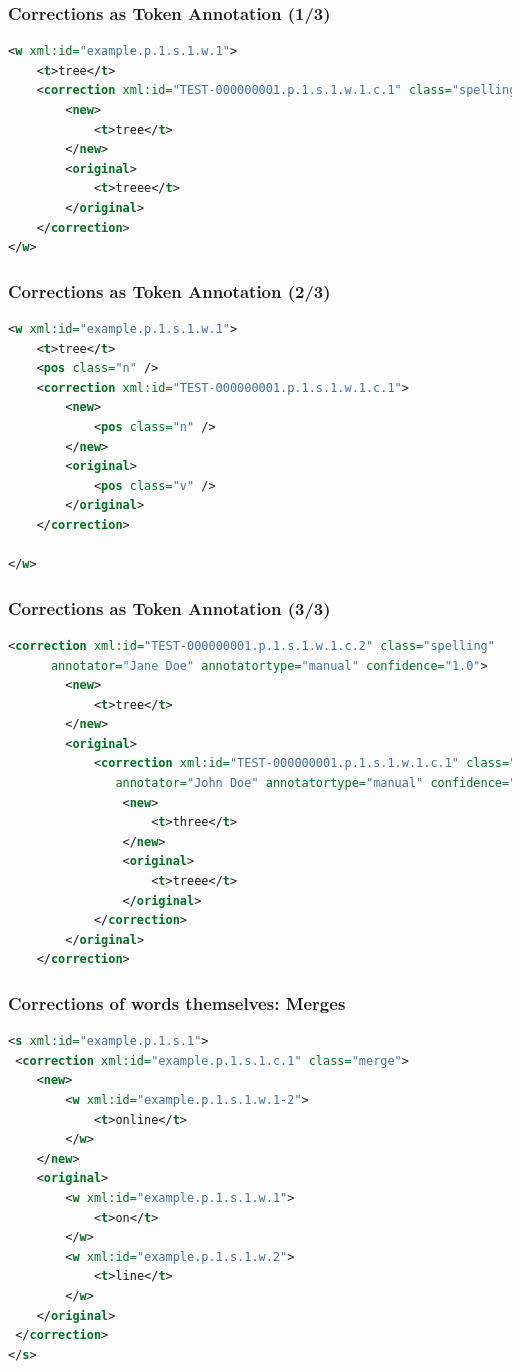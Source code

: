 \documentclass[compress]{beamer}
\begin{document}
        
\begin{frame}[fragile]
\frametitle{Corrections as Token Annotation (1/3)}

\begin{lstlisting}[language=xml]
<w xml:id="example.p.1.s.1.w.1">
    <t>tree</t>
    <correction xml:id="TEST-000000001.p.1.s.1.w.1.c.1" class="spelling">
        <new>
            <t>tree</t>
        </new>
        <original>
            <t>treee</t>
        </original>
    </correction>
</w>
\end{lstlisting}                 

\end{frame}


\begin{frame}[fragile]
\frametitle{Corrections as Token Annotation (2/3)}

\begin{lstlisting}[language=xml]
<w xml:id="example.p.1.s.1.w.1">
    <t>tree</t>
    <pos class="n" />
    <correction xml:id="TEST-000000001.p.1.s.1.w.1.c.1">
        <new>
            <pos class="n" />
        </new>
        <original>
            <pos class="v" />
        </original>
    </correction>
    
</w>    
\end{lstlisting}

\end{frame}

\begin{frame}[fragile]
\frametitle{Corrections as Token Annotation (3/3)}

\begin{lstlisting}[language=xml]
    <correction xml:id="TEST-000000001.p.1.s.1.w.1.c.2" class="spelling" 
      annotator="Jane Doe" annotatortype="manual" confidence="1.0">
        <new>
            <t>tree</t>
        </new>
        <original>
            <correction xml:id="TEST-000000001.p.1.s.1.w.1.c.1" class="spelling"
               annotator="John Doe" annotatortype="manual" confidence="0.6">
                <new>
                    <t>three</t>
                </new>
                <original>
                    <t>treee</t>
                </original>
            </correction>
        </original>
    </correction>
\end{lstlisting}

\end{frame}

\begin{frame}[fragile]
\frametitle{Corrections of words themselves: Merges}

\begin{lstlisting}[language=xml]
<s xml:id="example.p.1.s.1">
 <correction xml:id="example.p.1.s.1.c.1" class="merge">
    <new>
        <w xml:id="example.p.1.s.1.w.1-2">    
            <t>online</t>
        </w>
    </new>
    <original>
        <w xml:id="example.p.1.s.1.w.1">
            <t>on</t>
        </w>
        <w xml:id="example.p.1.s.1.w.2">
            <t>line</t>
        </w>                         
    </original>
 </correction>               
</s>
\end{lstlisting} 

\end{frame}
\end{document}
